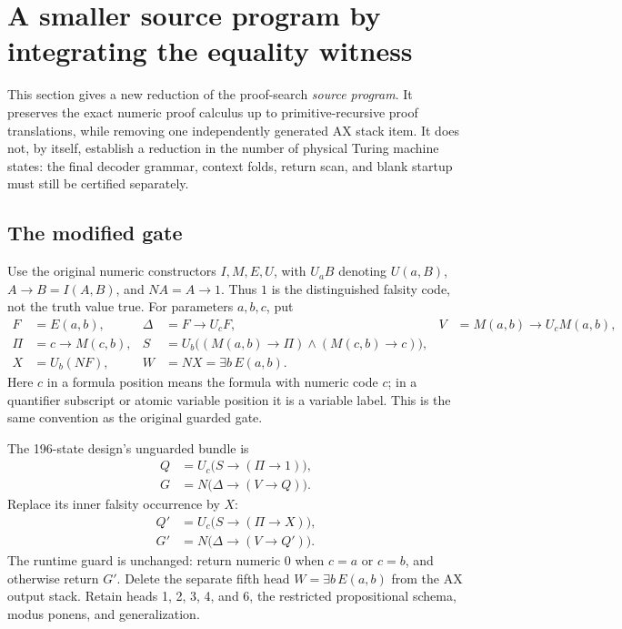 \section{A smaller source program by integrating the equality witness}
\label{sec:integrated-equality-witness}

This section gives a new reduction of the proof-search \emph{source program}.
It preserves the exact numeric proof calculus up to primitive-recursive proof
translations, while removing one independently generated AX stack item.  It
does not, by itself, establish a reduction in the number of physical Turing
machine states: the final decoder grammar, context folds, return scan, and
blank startup must still be certified separately.

\subsection{The modified gate}

Use the original numeric constructors $I,M,E,U$, with $U_a B$ denoting
$U(a,B)$, $A\to B=I(A,B)$, and $N A=A\to1$.  Thus $1$ is the distinguished
falsity code, not the truth value true.  For parameters $a,b,c$, put
\begin{align*}
 F&=E(a,b),&
 \Delta&=F\to U_cF,&
 V&=M(a,b)\to U_cM(a,b),\\
 \Pi&=c\to M(c,b),&
 S&=U_b\bigl((M(a,b)\to\Pi)\mathbin{\wedge}(M(c,b)\to c)\bigr),\\
 X&=U_b(NF),& W&=N X=\exists b\,E(a,b).
\end{align*}
Here $c$ in a formula position means the formula with numeric code $c$; in a
quantifier subscript or atomic variable position it is a variable label.  This
is the same convention as the original guarded gate.

The 196-state design's unguarded bundle is
\begin{align*}
 Q&=U_c\bigl(S\to(\Pi\to1)\bigr),\\
 G&=N\bigl(\Delta\to(V\to Q)\bigr).
\end{align*}
Replace its inner falsity occurrence by $X$:
\begin{align*}
 Q'&=U_c\bigl(S\to(\Pi\to X)\bigr),\\
 G'&=N\bigl(\Delta\to(V\to Q')\bigr).
\end{align*}
The runtime guard is unchanged: return numeric $0$ when $c=a$ or $c=b$, and
otherwise return $G'$.  Delete the separate fifth head
$W=\exists b\,E(a,b)$ from the AX output stack.  Retain heads 1, 2, 3, 4, and 6,
the restricted propositional schema, modus ponens, and generalization.

